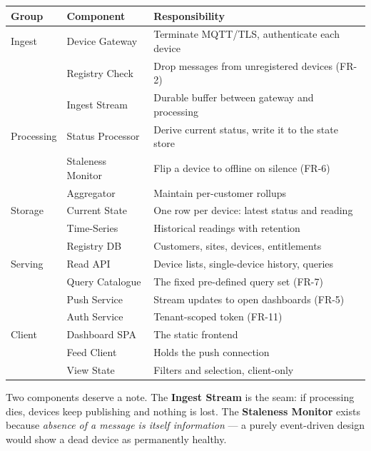\documentclass[11pt,a4paper]{article}
\begin{document}
\begin{center}
\small
\begin{tabularx}{\textwidth}{@{}l l X@{}}
\toprule
\textbf{Group} & \textbf{Component} & \textbf{Responsibility} \\
\midrule
Ingest     & Device Gateway    & Terminate MQTT/TLS, authenticate each device \\
           & Registry Check    & Drop messages from unregistered devices (FR-2) \\
           & Ingest Stream     & Durable buffer between gateway and processing \\
\midrule
Processing & Status Processor  & Derive current status, write it to the state store \\
           & Staleness Monitor & Flip a device to offline on silence (FR-6) \\
           & Aggregator        & Maintain per-customer rollups \\
\midrule
Storage    & Current State     & One row per device: latest status and reading \\
           & Time-Series       & Historical readings with retention \\
           & Registry DB       & Customers, sites, devices, entitlements \\
\midrule
Serving    & Read API          & Device lists, single-device history, queries \\
           & Query Catalogue   & The fixed pre-defined query set (FR-7) \\
           & Push Service      & Stream updates to open dashboards (FR-5) \\
           & Auth Service      & Tenant-scoped token (FR-11) \\
\midrule
Client     & Dashboard SPA     & The static frontend \\
           & Feed Client       & Holds the push connection \\
           & View State        & Filters and selection, client-only \\
\bottomrule
\end{tabularx}
\end{center}

\medskip
\noindent
Two components deserve a note. The \textbf{Ingest Stream} is the seam: if processing
dies, devices keep publishing and nothing is lost. The \textbf{Staleness Monitor}
exists because \emph{absence of a message is itself information} --- a purely
event-driven design would show a dead device as permanently healthy.
\end{document}
